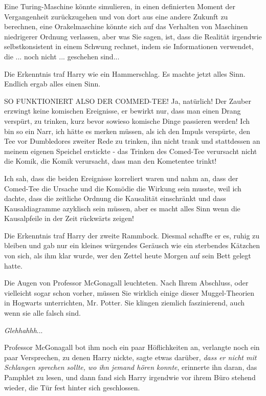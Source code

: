 Eine Turing-Maschine könnte simulieren, in einen definierten Moment der
Vergangenheit zurückzugehen und von dort aus eine andere Zukunft zu berechnen,
eine Orakelmaschine könnte sich auf das Verhalten von Maschinen niedrigerer
Ordnung verlassen, aber was Sie sagen, ist, dass die Realität irgendwie
selbstkonsistent in einem Schwung rechnet, indem sie Informationen verwendet,
die ... noch nicht ... geschehen sind...\grqq{}

Die Erkenntnis traf Harry wie ein Hammerschlag. Es machte jetzt alles Sinn.
Endlich ergab alles einen Sinn.

\glqq SO FUNKTIONIERT ALSO DER COMMED-TEE! Ja, natürlich! Der Zauber erzwingt
keine komischen Ereignisse, er bewirkt nur, dass man einen Drang verspürt, zu
trinken, kurz bevor sowieso komische Dinge passieren werden! Ich bin so ein
Narr, ich hätte es merken müssen, als ich den Impuls verspürte, den Tee vor
Dumbledores zweiter Rede zu trinken, ihn nicht trank und stattdessen an meinem
eigenen Speichel erstickte - das Trinken des Comed-Tee verursacht nicht die
Komik, die Komik verursacht, dass man den Kometentee trinkt!

Ich sah, dass die beiden Ereignisse korreliert waren und nahm an, dass der
Comed-Tee die Ursache und die Komödie die Wirkung sein musste, weil ich dachte,
dass die zeitliche Ordnung die Kausalität einschränkt und dass Kausaldiagramme
azyklisch sein müssen, aber es macht alles Sinn wenn die Kausalpfeile in der
Zeit rückwärts zeigen!\grqq{}

Die Erkenntnis traf Harry der zweite Rammbock. Diesmal schaffte er es, ruhig zu
bleiben und gab nur ein kleines würgendes Geräusch wie ein sterbendes Kätzchen
von sich, als ihm klar wurde, wer den Zettel heute Morgen auf sein Bett gelegt
hatte.

Die Augen von Professor McGonagall leuchteten. \glqq Nach Ihrem Abschluss, oder
vielleicht sogar schon vorher, müssen Sie wirklich einige dieser Muggel-Theorien
in Hogwarts unterrichten, Mr. Potter. Sie klingen ziemlich faszinierend, auch
wenn sie alle falsch sind.\grqq{}

\glqq \emph{Glehhahhh}...\grqq{}

Professor McGonagall bot ihm noch ein paar Höflichkeiten an, verlangte noch ein
paar Versprechen, zu denen Harry nickte, sagte etwas darüber, \emph{dass er
nicht mit Schlangen sprechen sollte, wo ihn jemand hören konnte}, erinnerte ihn
daran, das Pamphlet zu lesen, und dann fand sich Harry irgendwie vor ihrem Büro
stehend wieder, die Tür fest hinter sich geschlossen.


